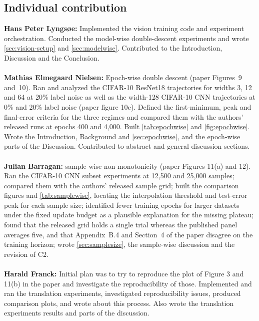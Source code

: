 \documentclass{article}
\begin{document}
\subsection{Individual contribution}
\textbf{Hans Peter Lyngsøe:}
Implemented the vision training code and experiment orchestration. Conducted the model-wise double-descent experiments and wrote \autoref{sec:vision-setup} and \autoref{sec:modelwise}. Contributed to the Introduction, Discussion and the Conclusion.
\\ \\
\textbf{Mathias Elmegaard Nielsen:}
Epoch-wise double descent (paper Figures~9 and~10). Ran and analyzed the CIFAR-10 ResNet18 trajectories for widths
3, 12 and 64 at 20\% label noise as well as the width-128 CIFAR-10 CNN trajectories at 0\% and 20\% label noise (paper figure 10c). Defined the first-minimum, peak and final-error criteria for the three regimes and compared them with the authors' released runs at epochs 400 and 4,000. Built \autoref{tab:epochwise} and \autoref{fig:epochwise}. Wrote the Introduction, Background and \autoref{sec:epochwise}, and the epoch-wise parts of the Discussion. Contributed to abstract and general discussion sections.
\\ \\
\textbf{Julian Barragan:} sample-wise non-monotonicity (paper Figures 11(a)
and 12). Ran the CIFAR-10 CNN subset experiments at 12,500 and 25,000 samples;
compared them with the authors' released sample grid; built the comparison
figures and \autoref{tab:samplewise}, locating the interpolation threshold and
test-error peak for each sample size; identified fewer training epochs for
larger datasets under the fixed update budget as a plausible explanation
for the missing plateau; found that the
released grid holds a single trial whereas the published panel averages five,
and that Appendix~B.4 and Section~4 of the paper disagree on the training
horizon; wrote \autoref{sec:samplesize}, the sample-wise discussion and the revision of C2.
\\ \\
\textbf{Harald Franck:}
Initial plan was to try to reproduce the plot of Figure 3 and 11(b) in the paper and investigate the reproducibility of those.
Implemented and ran the translation experiments, investigated reproducibility issues, produced comparison plots, and wrote about this process. Also wrote the translation experiments results and parts of the discussion.

\clearpage
\end{document}
